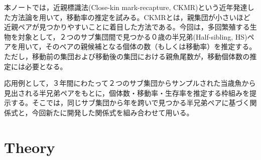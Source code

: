 \documentclass[AMA,STIX1COL]{WileyNJD-v2}
\begin{document}
本ノートでは，近親標識法(Close-kin mark-recapture, CKMR)という近年発達した方法論を用いて，移動率の推定を試みる。CKMRとは，親集団が小さいほど近親ペアが見つかりやすいことに着目した方法である。今回は，多回繁殖する生物を対象として，２つのサブ集団間で見つかる０歳の半兄弟(Half-sibling, HS)ペアを用いて，そのペアの親候補となる個体の数（もしくは移動率）を推定する。ただし，移動前の集団および移動後の集団における親魚尾数が，移動個体数の推定には必要となる。

応用例として，３年間にわたって２つのサブ集団からサンプルされた当歳魚から見出される半兄弟ペアをもとに，個体数・移動率・生存率を推定する枠組みを提示する。そこでは，同じサブ集団から年を跨いで見つかる半兄弟ペアに基づく関係式と，今回新たに開発した関係式を組み合わせて用いる。

\section{Theory}\label{sec2}
\end{document}

